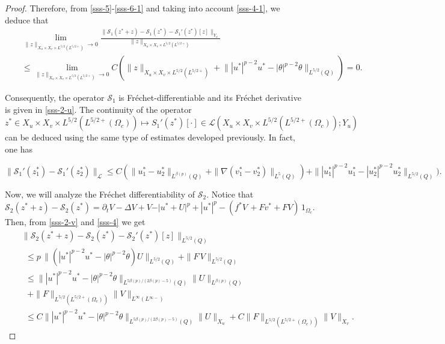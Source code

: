 \documentclass[11pt,reqno]{amsart}%
\numberwithin{equation}{section}
\begin{document}
{\begin{proof}
%
Therefore, from \eqref{sss-5}-\eqref{sss-6-1}  
and taking into account \eqref{sss-4-1}, we deduce that
\begin{eqnarray*}
&&\lim_{\| z \|_{{X}_{u}\times {X}_{v}
\times L^{5/2}(L^{5/2+})} \to0}
\frac{\|\mathcal{S}_1(z^*+z)-\mathcal{S}_1(z^*)-\mathcal{S}_1'(z^*)[z]\|_{Y_u}}
{\|z \|_{ {X}_{ u}\times {X}_{v}
\times L^{5/2}(L^{5/2+})}}\\
&&
 \le \lim_{\| z \|_{{X}_{ u}\times{X}_{v}\times L^{5/2}(L^{5/2+})} \to0}
C \left(\| z \|_{{X}_{u}\times{X}_{v}
\!\times L^{5/2}(L^{5/2+})}
+
\!\| |u^*|^{p-2} u^* - |\theta|^{p-2}\theta \|_{L^{ 5/2}(Q)}\right)=0.
\end{eqnarray*}


Consequently, the operator $\mathcal{S}_1$ is Fr\'echet-differentiable and its Fr\'echet derivative is given in
\eqref{sss-2-u}. The continuity of the operator 
$$z^*\in X_u\times X_v\times L^{5/2}(L^{5/2+}(\Omega_c)) \longmapsto S_1'(z^*)[\cdot]\in  \mathcal{L}(X_u\times X_v\times L^{5/2}(L^{5/2+}(\Omega_c));Y_u)$$ can be deduced using the same type of estimates developed previously. In fact, one has

$$
\| \mathcal{S}_1'(z_1^*)-\mathcal{S}_1'(z_2^*)\|_{ \mathcal{L} }%
\le C(\| u_1^*-u_2^*\|_{L^{\beta(p)}(Q)} + \| \nabla (v_1^*-v_2^*) \|_{L ^{5}(Q)})
+ \| |u_1^*|^{p-2}u_1^*-|u_2^*|^{p-2}u_2^* \|_{L^{5/2}(Q)}).
$$


Now, we will analyze the Fr\'echet differentiability of $\mathcal{S}_2$. Notice that
$$
\mathcal{S}_2(z^*+z)-\mathcal{S}_2(z^*)
=\partial_t V-\Delta V+ V -
\vert u^*+U \vert^{p} 
+|u^*|^p - (f^* V\,+ F v^* + F V)\,1_{\Omega_c}.
$$
Then, 
from \eqref{sss-2-v} and \eqref{sss-4} we get
%
\begin{eqnarray*}
&&\|\mathcal{S}_2(z^*+z)-\mathcal{S}_2(z^*)-\mathcal{S}_2'(z^*)[z]\|_{L^{ 5/2}(Q)}\\
&&\ \ \le 
p\, \| ( |u^*|^{p-2} u^* -|\theta|^{p-2}\theta)U\|_{L^{ 5/2}(Q)} + \| F \, V\|_{L^{ 5/2}(Q)}\\
&&\ \ \le  \||u^*|^{p-2} u^* -|\theta|^{p-2}\theta\|_{L^{5\beta(p)/(2\beta(p)-5)}(Q)}
\|U\|_{L^{ \beta(p)}(Q)}\\
&&\ \ \ +   \| F \|_{L^{5/2}(L^{5/2+}(\Omega_c))}\|V\|_{L^\infty(L{^{\infty-}})}\\
&&\ \ \le C  \||u^*|^{p-2} u^* -|\theta|^{p-2}\theta\|_{L^{5\beta(p)/(2\beta(p)-5)}(Q)}\|U\|_{X_u}+ C\| F \|_{L^{5/2}(L^{5/2+}(\Omega_c))}\|V\|_{X_v}.
\end{eqnarray*}


\end{proof}}
\end{document}
